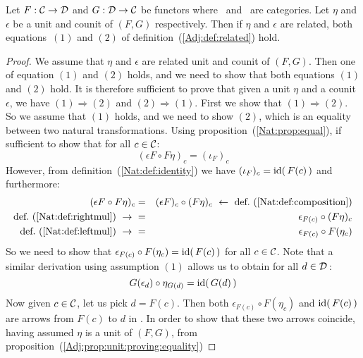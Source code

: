 \begin{prop}\label{Adj:prop:related:both}
    Let $F:\mbox{$\cal C$}\to\mbox{$\cal D$}$ and $G:\mbox{$\cal D$}\to\mbox{$\cal C$}$ be functors where \Cat\ and \Dat\ 
    are categories. Let $\eta$ and $\epsilon$ be a unit and counit of $(F,G)$ 
    respectively. Then if $\eta$ and $\epsilon$ are related, both equations~$(1)$
    and $(2)$ of definition~(\ref{Adj:def:related}) hold.
\end{prop}
\begin{proof}
    We assume that $\eta$ and $\epsilon$ are related unit and counit of $(F,G)$.
    Then one of equation $(1)$ and $(2)$ holds, and we need to show that both
    equations $(1)$ and $(2)$ hold. It is therefore sufficient to prove that
    given a unit $\eta$ and a counit $\epsilon$, we have $(1)\Rightarrow(2)$
    and $(2)\Rightarrow(1)$. First we show that $(1)\Rightarrow(2)$. So we
    assume that $(1)$ holds, and we need to show $(2)$, which is an equality
    between two natural transformations. Using proposition~(\ref{Nat:prop:equal}),
    if sufficient to show that for all $c\in\mbox{$\cal C$}$:
        \[
            (\epsilon F\circ F\eta)_{c} = (\iota_{F})_{c}
        \]
    However, from definition~(\ref{Nat:def:identity}) we have $(\iota_{F})_{c}=
    \mbox{\rm id}(\,F(c)\,)$ and furthermore:
        \begin{eqnarray*}(\epsilon F\circ F\eta)_{c}
            &=&(\epsilon F)_{c}\circ(F\eta)_{c}
            \ \leftarrow\ \mbox{def.~(\ref{Nat:def:composition})}\\
            \mbox{def.~(\ref{Nat:def:rightmul})}\ \to\ 
            &=&\epsilon_{F(c)}\circ(F\eta)_{c}\\
            \mbox{def.~(\ref{Nat:def:leftmul})}\ \to\ 
            &=&\epsilon_{F(c)}\circ F(\eta_{c})\\
        \end{eqnarray*}
    So we need to show that $\epsilon_{F(c)}\circ F(\eta_{c})=\mbox{\rm id}(\,F(c)\,)$
    for all $c\in\mbox{$\cal C$}$. Note that a similar derivation using assumption $(1)$ 
    allows us to obtain for all $d\in\mbox{$\cal D$}$\,:
        \begin{equation}\label{Adj:eqn:related:both:1}
            G(\epsilon_{d})\circ\eta_{G(d)}=\mbox{\rm id}(\,G(d)\,)
        \end{equation}
    Now given $c\in\mbox{$\cal C$}$, let us pick $d=F(c)$. Then both $\epsilon_{F(c)}\circ 
    F(\eta_{c})$ and $\mbox{\rm id}(\,F(c)\,)$ are arrows from $F(c)$ to $d$ in \Dat.
    In order to show that these two arrows coincide, having assumed $\eta$ is
    a unit of $(F,G)$, from proposition~(\ref{Adj:prop:unit:proving:equality})

\end{proof}
